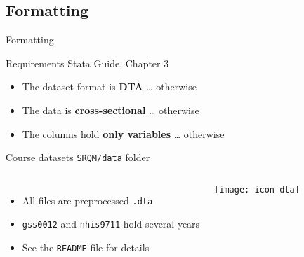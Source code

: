 \documentclass[t]{beamer}
\begin{document}
	\subsection{Formatting}
	
	\begin{frame}[t]{Formatting}
	
	  \begin{block}{Requirements \hfill Stata Guide, Chapter 3}

			\begin{itemize}
				\item The dataset format is \textbf{DTA} \hfill %
				… otherwise 
				
				\item The data is \textbf{cross-sectional} \hfill %
				… otherwise 
			
				\item The columns hold \textbf{only variables} \hfill %
				… otherwise 
			\end{itemize}

    \end{block}
		
	  \begin{block}{Course datasets \hfill \texttt{SRQM/data} folder}

			\begin{columns}[T]


					\begin{itemize}
						\item All files are preprocessed \texttt{.dta}				
						\item \texttt{gss0012} and \texttt{nhis9711} hold several years
						\item See the \texttt{README} file for details
					\end{itemize}
				
				
					\begin{center}
						\vspace{-1.5em}
						\texttt{[image: icon-dta]}
					\end{center}
				
			\end{columns}

    \end{block}
		
	\end{frame}
	
\end{document}
